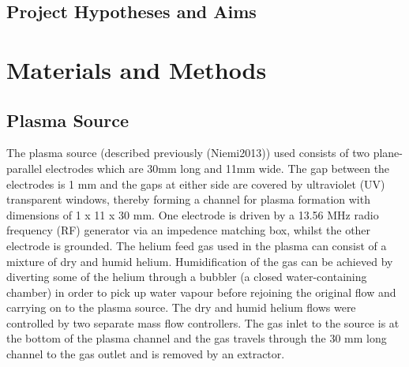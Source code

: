 \documentclass[11pt, oneside]{article}   	%
\begin{document}
\subsection{Project Hypotheses and Aims}


\section{Materials and Methods}

\subsection{Plasma Source}
The plasma source (described previously (Niemi2013)) used consists of two plane-parallel electrodes which are 30mm long and 11mm wide. 
The gap between the electrodes is 1 mm and the gaps at either side are covered by ultraviolet (UV) transparent windows, thereby forming a channel for plasma formation with dimensions of 1 x 11 x 30 mm.
One electrode is driven by a 13.56 MHz radio frequency (RF) generator via an impedence matching box, whilst the other electrode is grounded. 
The helium feed gas used in the plasma can consist of a mixture of dry and humid helium. Humidification of the gas can be achieved by diverting some of the helium through a bubbler (a closed water-containing chamber) in order to pick up water vapour before rejoining the original flow and carrying on to the plasma source.
The dry and humid helium flows were controlled by two separate mass flow controllers.
The gas inlet to the source is at the bottom of the plasma channel and the gas travels through the 30 mm long channel to the gas outlet and is removed by an extractor.
\end{document}
